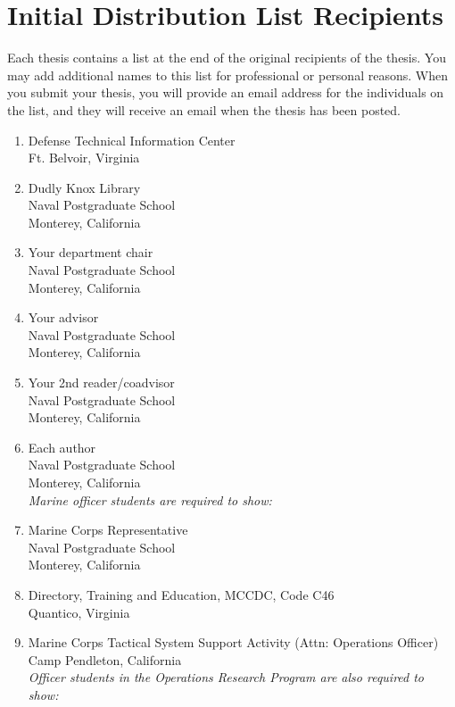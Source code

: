 \section{Initial Distribution List Recipients}
Each thesis contains a list at the end of the original recipients of the thesis.  You may 
add additional names to this list for professional or personal reasons.  When you submit your
thesis, you will provide an email address for the individuals on the list, and they will 
receive an email when the thesis has been posted.

\begin{enumerate}
  \item Defense Technical Information Center\\Ft. Belvoir, Virginia
  \item Dudly Knox Library\\Naval Postgraduate School\\Monterey, California
  \item Your department chair\\Naval Postgraduate School\\Monterey, California
  \item Your advisor\\Naval Postgraduate School\\Monterey, California
  \item Your 2nd reader/coadvisor\\Naval Postgraduate School\\Monterey, California
  \item Each author\\Naval Postgraduate School\\Monterey, California\\
    
  \textit{Marine officer students are required to show:}

  \item Marine Corps Representative\\Naval Postgraduate School\\Monterey, California
  \item Directory, Training and Education, MCCDC, Code C46\\Quantico, Virginia
  \item Marine Corps Tactical System Support Activity (Attn: Operations
    Officer)\\Camp Pendleton, California\\

  \textit{Officer students in the Operations Research Program are also required
    to show:}


\end{enumerate}
